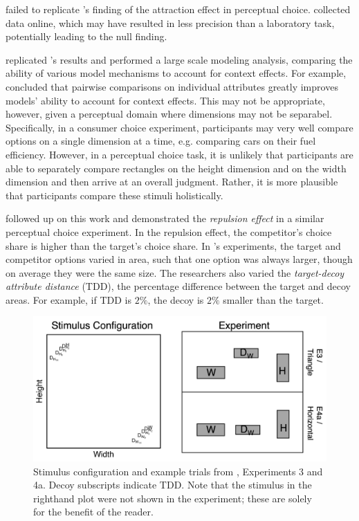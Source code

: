 \textcite{frederickLimitsAttraction2014b} failed to replicate \textcite{trueblood2013not}'s finding of the attraction effect in perceptual choice. \textcite{frederickLimitsAttraction2014b} collected data online, which may have resulted in less precision than a laboratory task, potentially leading to the null finding.

\textcite{turnerCompetingTheoriesMultialternative2018a} replicated \textcite{trueblood2013not}'s results and performed a large scale modeling analysis, comparing the ability of various model mechanisms to account for context effects. For example, \textcite{turnerCompetingTheoriesMultialternative2018a} concluded that pairwise comparisons on individual attributes greatly improves models' ability to account for context effects. This may not be appropriate, however, given a perceptual domain where dimensions may not be separabel. Specifically, in a consumer choice experiment, participants may very well compare options on a single dimension at a time, e.g. comparing cars on their fuel efficiency. However, in a perceptual choice task, it is unlikely that participants are able to separately compare rectangles on the height dimension and on the width dimension and then arrive at an overall judgment. Rather, it is more plausible that participants compare these stimuli holistically.

\textcite{spektorWhenGoodLooks2018b} followed up on this work and demonstrated the \textit{repulsion effect} in a similar perceptual choice experiment. In the repulsion effect, the competitor's choice share is higher than the target's choice share. In \textcite{spektorWhenGoodLooks2018b}'s experiments, the target and competitor options varied in area, such that one option was always larger, though on average they were the same size. The researchers also varied the \textit{target-decoy attribute distance} (TDD), the percentage difference between the target and decoy areas. For example, if TDD is $2\%$, the decoy is $2\%$ smaller than the target. 

\begin{figure}
   \includegraphics[width=\linewidth]{figures/spektor_stim.png}
   \caption{Stimulus configuration and example trials from \textcite{spektorWhenGoodLooks2018b}, Experiments 3 and 4a. Decoy subscripts indicate TDD. Note that the stimulus in the righthand plot were not shown in the experiment; these are solely for the benefit of the reader.}
   \label{fig:spektor_stim}
\end{figure}

